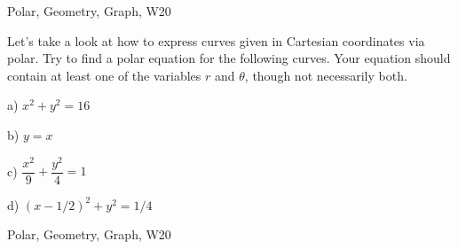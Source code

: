 \begin{tagblock}{Polar, Geometry, Graph, W20}
\begin{question}

Let's take a look at how to express curves given in Cartesian coordinates via polar. Try to find a polar equation for the following curves. Your equation should contain at least one of the variables $r$ and $\theta$, though not necessarily both.

\bigskip

a) $x^2+y^2=16$

\bigskip

b) $y=x$

\bigskip

c) $\dfrac{x^2}9+\dfrac{y^2}{4}=1$

\bigskip

d) $(x-1/2)^2+y^2=1/4$
	
	
\begin{tags}
	    Polar, Geometry, Graph, W20
\end{tags}
	
\begin{diary}
\end{diary}
	
\begin{solution}
	   
\end{solution}
	
\end{question}

\end{tagblock}

